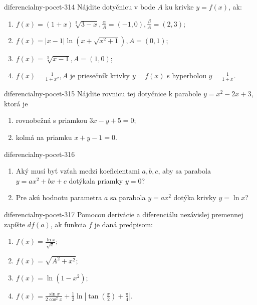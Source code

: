 \begin{defproblem}{diferencialny-pocet-314}
Nájdite dotyčnicu v bode $A$ ku krivke $y=f(x)$, ak:
\begin{enumerate}
\item $f(x)=(1+x)\sqrt[3]{3-x},\frac{\alpha}{A}=(-1,0),\frac{\beta}{A}=(2,3)$;
\item $f(x)=|x-1|\ln (x+\sqrt{x^2+1}),A=(0,1)$;
\item $f(x)=\sqrt[3]{x-1},A=(1,0)$;
\item $f(x)=\frac{1}{1+x^2},A$ je priesečník krivky $y=f(x)$ s hyperbolou $y=\frac{1}{1+x}$.
\end{enumerate}
\end{defproblem}

\begin{defproblem}{diferencialny-pocet-315}
Nájdite rovnicu tej dotyčnice k parabole $y=x^2-2x+3$, ktorá je
\begin{enumerate}
\item rovnobežná s priamkou $3x-y+5=0$;
\item kolmá na priamku $x+y-1=0$.
\end{enumerate}
\end{defproblem}

\begin{defproblem}{diferencialny-pocet-316}
\begin{enumerate}
\item Aký musí byť vzťah medzi koeficientami $a,b,c$, aby sa parabola $y=ax^2+bx+c$ dotýkala priamky $y=0$?
\item Pre akú hodnotu parametra $a$ sa parabola $y=ax^2$ dotýka krivky $y=\ln x$?
\end{enumerate}
\end{defproblem}

\begin{defproblem}{diferencialny-pocet-317}
Pomocou derivácie a diferenciálu nezávislej premennej zapíšte $df(a)$, ak funkcia $f$ je daná predpisom:
\begin{multicols}{2}
\begin{enumerate}
    \item $f(x)=\frac{\ln x}{\sqrt{x}}$;
    \item $f(x)=\sqrt{A^2+x^2}$;
    \item $f(x)=\ln (1-x^2)$;
    \item $f(x)=\frac{\sin x}{2\cos^2 x}+\frac{1}{2}\ln |\tan (\frac{x}{2})+\frac{\pi}{4}|$.
\end{enumerate}
\end{multicols}
\end{defproblem}

